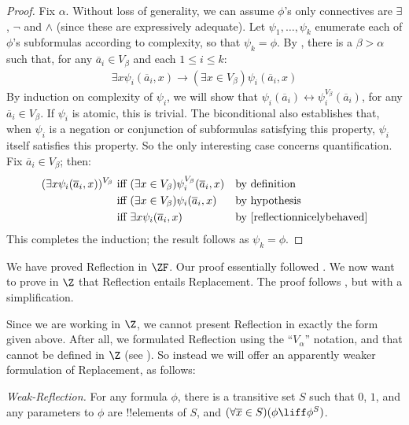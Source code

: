 \documentclass[../../../include/open-logic-section]{subfiles}
\begin{document}
\begin{proof}[Proof] 
Fix $\alpha$. Without loss of generality, we can assume $\phi$'s only
connectives are $\exists$, $\lnot$ and $\land$ (since these are
expressively adequate). Let $\psi_1, \ldots, \psi_k$ enumerate each of
$\phi$'s subformulas according to complexity, so that $\psi_k = \phi$.
By , there is a $\beta > \alpha$ such that, for
any $\overline{a}_i \in V_\beta$ and each $1 \leq i \leq k$:
\begin{align}\label{reflectionnicelybehaved}
	\exists x\psi_i(\overline{a}_i, x) \rightarrow 
	(\exists x \in V_\beta) \psi_i(\overline{a}_i, x)\tag{*}
\end{align}
By induction on complexity of $\psi_i$, we will show that
$\psi_i(\overline{a}_i) \leftrightarrow
\psi_i^{V_\beta}(\overline{a}_i)$, for any  $\overline{a}_i \in
V_\beta$. 	If $\psi_i$ is atomic, this is trivial. The biconditional
also establishes that, when $\psi_i$ is a negation or conjunction of
subformulas satisfying this property, $\psi_i$ itself satisfies this
property. So the only interesting case concerns quantification. Fix
$\overline{a}_i \in V_\beta$; then:
\begin{align*}
	(\exists x \psi_i(\overline{a}_i, x))^{V_\beta}
	&\text{ iff }
	(\exists x \in V_\beta)\psi_i^{V_\beta}(\overline{a}_i, x)
	&&\text{by definition}\\
	&\text{ iff }
	(\exists x \in V_\beta)\psi_i(\overline{a}_i,  x)
	&&\text{by hypothesis}\\
	&\text{ iff }
	\exists x \psi_i(\overline{a}_i, x)
	&&\text{by \eqref{reflectionnicelybehaved}}
\end{align*}
This completes the induction; the result follows as $\psi_k = \phi$.
\end{proof}

We have proved Reflection in $\ZF$. Our proof essentially
followed \cite{Montague1961}. We now want to prove in $\Z$ that
Reflection entails Replacement. The proof follows \cite{Levy1960},
but with a simplification. 

Since we are working in $\Z$, we cannot present Reflection in exactly
the form given above. After all, we formulated Reflection using the
``$V_\alpha$'' notation, and that cannot be defined in $\Z$ (see
). So instead we will offer an apparently
weaker formulation of Replacement, as follows:

\begin{defish}
\emph{Weak-Reflection.} For any formula $\phi$, there is a transitive
set $S$ such that $0$, $1$, and any parameters to $\phi$ are
!!{element}s of $S$, and $(\forall \overline{x} \in S)(\phi \liff
\phi^S)$.
\end{defish}
\end{document}
